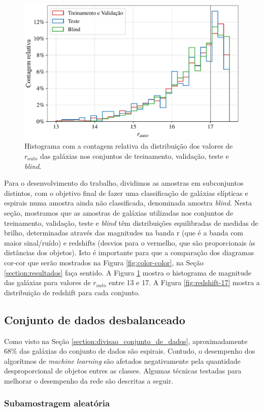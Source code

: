 \begin{figure}[!ht]
  \centering
  \includegraphics[width=0.58\linewidth]{figures/hist_rauto.pdf}
  \caption{Histograma com a contagem relativa da distribuição dos valores de $r_{auto}$ das galáxias nos conjuntos de treinamento, validação, teste e \emph{blind}.}
  \label{fig:dist-rauto}
\end{figure}

Para o desenvolvimento do trabalho, dividimos as amostras em subconjuntos distintos, com o objetivo final de fazer uma classificação de galáxias elípticas e espirais numa amostra ainda não classificada, denominada amostra \emph{blind}. Nesta seção, mostramos que as amostras de galáxias utilizadas nos conjuntos de treinamento, validação, teste e \emph{blind} têm distribuições equilibradas de medidas de brilho, determinadas através das magnitudes na banda r (que é a banda com maior sinal/ruído) e redshifts (desvios para o vermelho, que são proporcionais às distâncias dos objetos). Isto é importante para que a comparação dos diagramas cor-cor que serão mostrados na Figura \ref{fig:color-color}, na Seção \ref{section:resultados} faça sentido. A Figura \ref{fig:dist-rauto} mostra o histograma de magnitude das galáxias para valores de $r_{auto}$ entre 13 e 17. A Figura \ref{fig:redshift-17} mostra a distribuição de redshift para cada  conjunto.

\subsection{Conjunto de dados desbalanceado}

Como visto na Seção \ref{section:divisao_conjunto_de_dados}, aproximadamente 68\% das galáxias do conjunto de dados são espirais. Contudo, o desempenho dos algorítmos de \emph{machine learning} são afetados negativamente pela quantidade desproporcional de objetos entres as classes. Algumas técnicas testadas para melhorar o desempenho da rede são descritas a seguir.

\subsubsection{Subamostragem aleatória}

